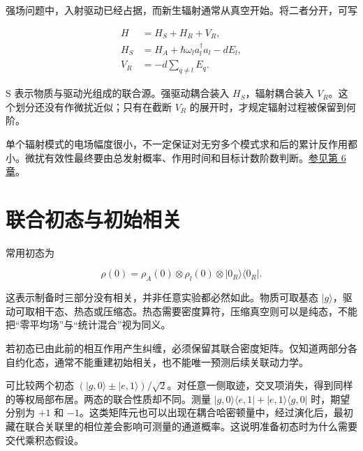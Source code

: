 \documentclass[UTF8,a4paper,zihao=-4,openany,fontset=fandol]{ctexbook}
\begin{document}
强场问题中，入射驱动已经占据，而新生辐射通常从真空开始。将二者分开，可写



\begin{equation*}
\begin{aligned}
H&=H_S+H_R+V_R,\\
H_S&=H_A+\hbar\omega_la_l^\dagger a_l-dE_l,\\
V_R&=-d\sum_{q\ne l}E_q.
\end{aligned}
\tag{3.4}\label{eq:3.4}
\end{equation*}


S 表示物质与驱动光组成的联合源。强驱动耦合装入 $H_S$，辐射耦合装入 $V_R$。这个划分还没有作微扰近似；只有在截断 $V_R$ 的展开时，才规定辐射过程被保留到何阶。



单个辐射模式的电场幅度很小，不一定保证对无穷多个模式求和后的累计反作用都小。微扰有效性最终要由总发射概率、作用时间和目标计数阶数判断。\hyperref[ch:06]{参见第 6 章}。



\section{联合初态与初始相关}\label{sec:03:6}


常用初态为



\begin{equation*}
\rho(0)=\rho_A(0)\otimes\rho_l(0)\otimes|0_R\rangle\langle0_R|.
\tag{3.5}\label{eq:3.5}
\end{equation*}


这表示制备时三部分没有相关，并非任意实验都必然如此。物质可取基态 $|g\rangle$，驱动可取相干态、热态或压缩态。热态需要密度算符，压缩真空则可以是纯态，不能把“零平均场”与“统计混合”视为同义。



若初态已由此前的相互作用产生纠缠，必须保留其联合密度矩阵。仅知道两部分各自约化态，通常不能重建初始相关，也不能唯一预测后续关联动力学。



可比较两个初态 $(|g,0\rangle\pm|e,1\rangle)/\sqrt2$。对任意一侧取迹，交叉项消失，得到同样的等权局部布居。两态的联合性质却不同。测量 $|g,0\rangle\langle e,1|+|e,1\rangle\langle g,0|$ 时，期望分别为 $+1$ 和 $-1$。这类矩阵元也可以出现在耦合哈密顿量中，经过演化后，最初藏在联合关联里的相位差会影响可测量的通道概率。这说明准备初态时为什么需要交代乘积态假设。
\end{document}

